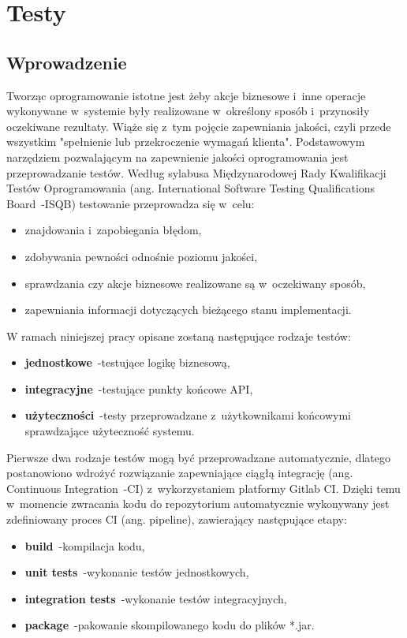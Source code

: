 \chapter{Testy}
\section{Wprowadzenie}
Tworząc oprogramowanie istotne jest żeby akcje biznesowe i~inne operacje wykonywane w~systemie były realizowane w~określony sposób i~przynosiły oczekiwane rezultaty.
Wiąże się z~tym pojęcie zapewniania jakości, czyli przede wszystkim "spełnienie lub przekroczenie wymagań klienta"\cite{book:jakosc-projektow-informatycznych}.
Podstawowym narzędziem pozwalającym na zapewnienie jakości oprogramowania jest przeprowadzanie testów.
Według sylabusa Międzynarodowej Rady Kwalifikacji Testów Oprogramowania (ang. International Software Testing Qualifications Board~-ISQB)\cite{url:istqb-syllabus} testowanie przeprowadza się w~celu:
\begin{itemize}
    \item znajdowania i~zapobiegania błędom,
    \item zdobywania pewności odnośnie poziomu jakości,
    \item sprawdzania czy akcje biznesowe realizowane są w~oczekiwany sposób,
    \item zapewniania informacji dotyczących bieżącego stanu implementacji.
\end{itemize}

W ramach niniejszej pracy opisane zostaną następujące rodzaje testów:
\begin{itemize}
    \item \textbf{jednostkowe}~-testujące logikę biznesową,
    \item \textbf{integracyjne}~-testujące punkty końcowe API,
    \item \textbf{użyteczności}~-testy przeprowadzane z~użytkownikami końcowymi sprawdzające użyteczność systemu.
\end{itemize}

Pierwsze dwa rodzaje testów mogą być przeprowadzane automatycznie, dlatego postanowiono wdrożyć rozwiązanie zapewniające ciągłą integrację (ang. Continuous Integration~-CI) z~wykorzystaniem platformy Gitlab CI\cite{tech:gitlab-pipelines}.
Dzięki temu w~momencie zwracania kodu do repozytorium automatycznie wykonywany jest zdefiniowany proces CI (ang. pipeline), zawierający następujące etapy:
\begin{itemize}
    \item \textbf{build}~-kompilacja kodu,
    \item \textbf{unit tests}~-wykonanie testów jednostkowych,
    \item \textbf{integration tests}~-wykonanie testów integracyjnych,
    \item \textbf{package}~-pakowanie skompilowanego kodu do plików *.jar.
\end{itemize}

